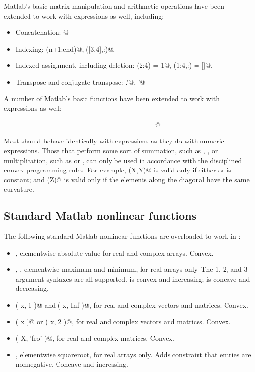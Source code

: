 \documentclass[12pt]{article}
\begin{document}
Matlab's basic matrix manipulation and arithmetic
operations have been extended to work with
\cvx expressions as well, including:
\begin{itemize}
\item Concatenation: \verb@[ A, B ; C, D ]@
\item Indexing: \verb@x(n+1:end)@, \verb@X([3,4],:)@, \etc
\item Indexed assignment, including deletion: \verb@y(2:4) = 1@, \verb@Z(1:4,:) = []@, \etc
\item Transpose and conjugate transpose: \verb@Z.'@, \verb@y'@
\end{itemize}
A number of Matlab's basic functions have been extended to work with \verb@cvx@
expressions as well:
\begin{center}
\verb@conj@\ \ \ \verb@cumsum@\ \ \ \verb@diag@\ \ \ \verb@dot@\ \ \ \verb@fliplr@\ \ \ \verb@flipud@\ \ \ \verb@flipdim@\ \ \ \verb@horzcat@\ \ \ \
\verb@hankel@\ \ \ \verb@ipermute@\ \ \ \verb@kron@\ \ \ \verb@permute@\ \ \ \verb@repmat@\ \ \ \verb@reshape@\ \ \ \
@\ \ \ \verb@sum@\ \ \ \verb@trace@\ \ \ \verb@tril@\ \ \ \verb@triu@\ \ \ \verb@toeplitz@\ \ \ \verb@vertcat@
\end{center}
Most should behave identically with \cvx expressions as they do with numeric expressions.
Those that perform some sort of summation, such as \verb@cumsum@, \verb@sum@, or
multiplication, such as \verb@dot@ or \verb@kron@, can
only be used in accordance with the disciplined convex programming rules. For example,
\verb@kron(X,Y)@ is valid only if either \verb@X@ or \verb@Y@ is constant; and 
\verb@trace(Z)@ is valid only if the elements along the diagonal have the same curvature.

\subsection{Standard Matlab nonlinear functions}
The following standard Matlab nonlinear functions 
are overloaded to work in \cvx:
\begin{itemize}
\item \verb@abs@, elementwise absolute value for real 
and complex arrays.
Convex.
\item \verb@max@, \verb@min@,
elementwise maximum and minimum, for real arrays only.
The 1, 2, and 3-argument syntaxes are all supported.
\verb@max@ is convex and increasing; \verb@min@ is concave and 
decreasing.
\item \verb@norm( x, 1 )@ and \verb@norm( x, Inf )@,
for real and complex vectors and matrices.
Convex.
\item \verb@norm( x )@ or \verb@norm( x, 2 )@, 
for real and complex vectors and matrices.
Convex.
\item \verb@norm( X, 'fro' )@, for real and complex matrices.
Convex.
\item \verb@sqrt@, elementwise squareroot, for real arrays only.
Adds constraint that entries are nonnegative.
Concave and increasing.
\end{itemize}
\end{document}
